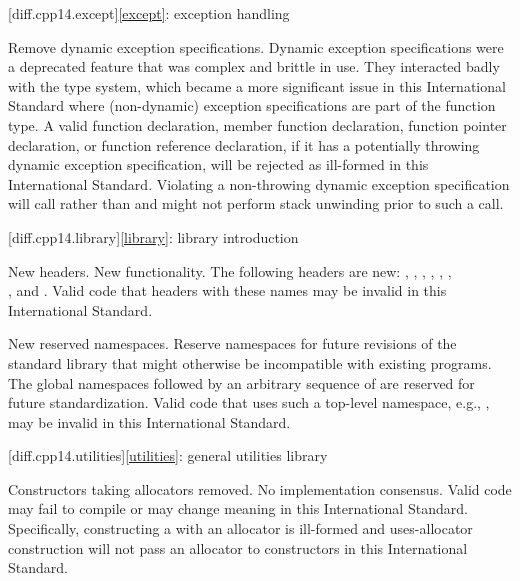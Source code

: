 [diff.cpp14.except]{\ref{except}: exception handling}

\change
Remove dynamic exception specifications.
\rationale
Dynamic exception specifications were a deprecated feature
that was complex and brittle in use.
They interacted badly with the type system,
which became a more significant issue in this International Standard
where (non-dynamic) exception specifications are part of the function type.
\effect
A valid \CppXIV{} function declaration,
member function declaration,
function pointer declaration,
or function reference declaration,
if it has a potentially throwing dynamic exception specification,
will be rejected as ill-formed in this International Standard.
Violating a non-throwing dynamic exception specification
will call 
rather than 
and might not perform stack unwinding prior to such a call.

[diff.cpp14.library]{\ref{library}: library introduction}

\change
New headers.
\rationale
New functionality.
\effect
The following \Cpp{} headers are new:
,
,
,
,
,
,\\
,
and
.
Valid \CppXIV{} code that  headers with these names may be
invalid in this International Standard.

\change
New reserved namespaces.
\rationale
Reserve namespaces for future revisions of the standard library
that might otherwise be incompatible with existing programs.
\effect
The global namespaces 
followed by an arbitrary sequence of 
are reserved for future standardization.
Valid \CppXIV{} code that uses such a top-level namespace,
e.g., , may be invalid in this International Standard.

[diff.cpp14.utilities]{\ref{utilities}: general utilities library}

\change
Constructors taking allocators removed.
\rationale
No implementation consensus.
\effect
Valid \CppXIV{} code may fail to compile or may change meaning in this
International Standard. Specifically, constructing a  with
an allocator is ill-formed and uses-allocator construction will not pass an
allocator to  constructors in this International Standard.


